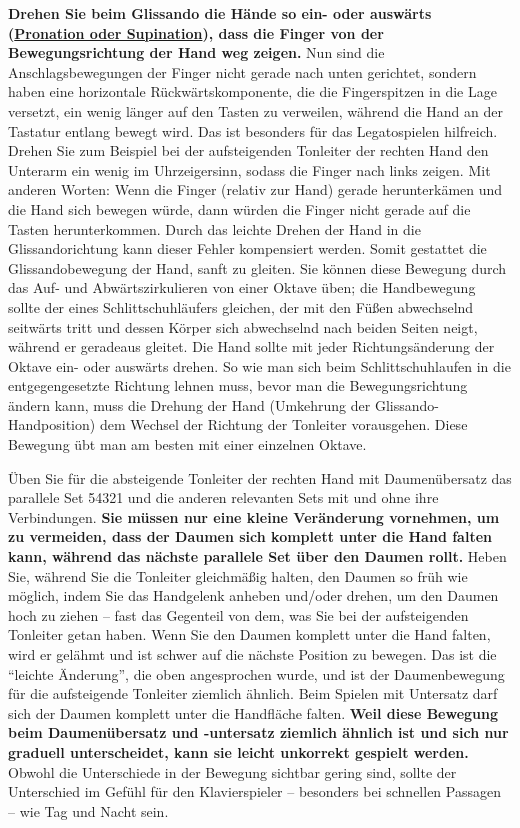 \textbf{Drehen Sie beim Glissando die Hände so ein- oder auswärts (\hyperref[c1iii4ProSup]{Pronation oder Supination}), dass die Finger von der Bewegungsrichtung der Hand weg zeigen.}
Nun sind die Anschlagsbewegungen der Finger nicht gerade nach unten gerichtet, sondern haben eine horizontale Rückwärtskomponente, die die Fingerspitzen in die Lage versetzt, ein wenig länger auf den Tasten zu verweilen, während die Hand an der Tastatur entlang bewegt wird.
Das ist besonders für das Legatospielen hilfreich.
Drehen Sie zum Beispiel bei der aufsteigenden Tonleiter der rechten Hand den Unterarm ein wenig im Uhrzeigersinn, sodass die Finger nach links zeigen.
Mit anderen Worten: Wenn die Finger (relativ zur Hand) gerade herunterkämen und die Hand sich bewegen würde, dann würden die Finger nicht gerade auf die Tasten herunterkommen.
Durch das leichte Drehen der Hand in die Glissandorichtung kann dieser Fehler kompensiert werden.
Somit gestattet die Glissandobewegung der Hand, sanft zu gleiten.
Sie können diese Bewegung durch das Auf- und Abwärtszirkulieren von einer Oktave üben; die Handbewegung sollte der eines Schlittschuhläufers gleichen, der mit den Füßen abwechselnd seitwärts tritt und dessen Körper sich abwechselnd nach beiden Seiten neigt, während er geradeaus gleitet.
Die Hand sollte mit jeder Richtungsänderung der Oktave ein- oder auswärts drehen.
So wie man sich beim Schlittschuhlaufen in die entgegengesetzte Richtung lehnen muss, bevor man die Bewegungsrichtung ändern kann, muss die Drehung der Hand (Umkehrung der Glissando-Handposition) dem Wechsel der Richtung der Tonleiter vorausgehen.
Diese Bewegung übt man am besten mit einer einzelnen Oktave.

Üben Sie für die absteigende Tonleiter der rechten Hand mit Daumenübersatz das parallele Set 54321 und die anderen relevanten Sets mit und ohne ihre Verbindungen.
\textbf{Sie müssen nur eine kleine Veränderung vornehmen, um zu vermeiden, dass der Daumen sich komplett unter die Hand falten kann, während das nächste parallele Set über den Daumen rollt.}
Heben Sie, während Sie die Tonleiter gleichmäßig halten, den Daumen so früh wie möglich, indem Sie das Handgelenk anheben und/oder drehen, um den Daumen hoch zu ziehen -- fast das Gegenteil von dem, was Sie bei der aufsteigenden Tonleiter getan haben.
Wenn Sie den Daumen komplett unter die Hand falten, wird er gelähmt und ist schwer auf die nächste Position zu bewegen.
Das ist die \enquote{leichte Änderung}, die oben angesprochen wurde, und ist der Daumenbewegung für die aufsteigende Tonleiter ziemlich ähnlich.
Beim Spielen mit Untersatz darf sich der Daumen komplett unter die Handfläche falten.
\textbf{Weil diese Bewegung beim Daumenübersatz und -untersatz ziemlich ähnlich ist und sich nur graduell unterscheidet, kann sie leicht unkorrekt gespielt werden.}
Obwohl die Unterschiede in der Bewegung sichtbar gering sind, sollte der Unterschied im Gefühl für den Klavierspieler -- besonders bei schnellen Passagen -- wie Tag und Nacht sein.

